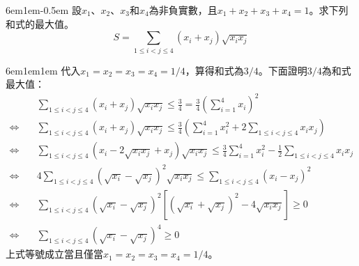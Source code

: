 \documentclass[12pt]{article}
\def\pA{-0.5em}
\def\Ap{1em}
\begin{document}
\begin{mybox}[Problem 8]{6em}{1em}{\pA}
    設$x_1$、$x_2$、$x_3$和$x_4$為非負實數，且$x_1+x_2+x_3+x_4=1$。求下列和式的最大值。
    $$
        S=\sum_{1\leq i<j\leq 4}{\left(x_i+x_j\right)\sqrt{x_ix_j}}
    $$
\end{mybox}
\begin{mybox}[Answer]{6em}{1em}{\Ap}
    代入$x_1=x_2=x_3=x_4=1/4$，算得和式為$3/4$。下面證明$3/4$為和式最大值：
    \begin{align*}
        &\sum_{1\leq i<j\leq 4}{\left(x_i+x_j\right)\sqrt{x_ix_j}}\leq\frac{3}{4}=\frac{3}{4}\left(\sum_{i=1}^{4}{x_i}\right)^2\\
        \Leftrightarrow\quad&\sum_{1\leq i<j\leq 4}{\left(x_i+x_j\right)\sqrt{x_ix_j}}\leq\frac{3}{4}\left(\sum_{i=1}^{4}{x_i^2}+2\sum_{1\leq i<j\leq 4}{x_ix_j}\right)\\
        \Leftrightarrow\quad&\sum_{1\leq i<j\leq 4}{\left(x_i-2\sqrt{x_ix_j}+x_j\right)\sqrt{x_ix_j}}\leq\frac{3}{4}\sum_{i=1}^{4}{x_i^2}-\frac{1}{2}\sum_{1\leq i<j\leq 4}{x_ix_j}\\
        \Leftrightarrow\quad&4\sum_{1\leq i<j\leq 4}{\left(\sqrt{x_i}-\sqrt{x_j}\right)^2\sqrt{x_ix_j}}\leq\sum_{1\leq i<j\leq 4}{\left(x_i-x_j\right)^2}\\
        \Leftrightarrow\quad&\sum_{1\leq i<j\leq 4}{\left(\sqrt{x_i}-\sqrt{x_j}\right)^2\left[\left(\sqrt{x_i}+\sqrt{x_j}\right)^2-4\sqrt{x_ix_j}\right]}\geq 0\\
        \Leftrightarrow\quad&\sum_{1\leq i<j\leq 4}{\left(\sqrt{x_i}-\sqrt{x_j}\right)^4}\geq 0
    \end{align*}
    上式等號成立當且僅當$x_1=x_2=x_3=x_4=1/4$。
\end{mybox}
\end{document}
